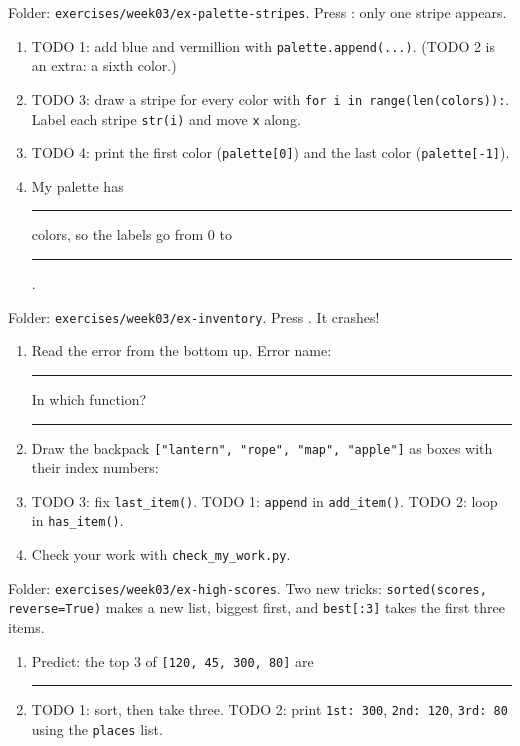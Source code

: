 \begin{exercise}
Folder: \texttt{exercises/week03/ex-palette-stripes}. Press : only one stripe appears.
\begin{enumerate}[leftmargin=1.4em]
  \item TODO 1: add blue and vermillion with \texttt{palette.append(...)}. (TODO 2 is an extra: a sixth color.)
  \item TODO 3: draw a stripe for every color with \texttt{for i in range(len(colors)):}. Label each stripe \texttt{str(i)} and move \texttt{x} along.
  \item TODO 4: print the first color (\texttt{palette[0]}) and the last color (\texttt{palette[-1]}).
  \item My palette has \rule{1cm}{0.4pt} colors, so the labels go from 0 to \rule{1cm}{0.4pt}.
\end{enumerate}
\end{exercise}

\begin{exercise}
Folder: \texttt{exercises/week03/ex-inventory}. Press . It crashes!
\begin{enumerate}[leftmargin=1.4em]
  \item Read the error from the bottom up. Error name: \rule{3.5cm}{0.4pt}\quad In which function? \rule{3.5cm}{0.4pt}
  \item Draw the backpack \texttt{["lantern", "rope", "map", "apple"]} as boxes with their index numbers:
  \answerspace{1.4cm}
  \item TODO 3: fix \texttt{last\_item()}. TODO 1: \texttt{append} in \texttt{add\_item()}. TODO 2: loop in \texttt{has\_item()}.
  \item Check your work with \texttt{check\_my\_work.py}.
\end{enumerate}
\end{exercise}

\begin{exercise}
Folder: \texttt{exercises/week03/ex-high-scores}. Two new tricks:
\texttt{sorted(scores, reverse=True)} makes a new list, biggest first, and \texttt{best[:3]} takes the first three items.
\begin{enumerate}[leftmargin=1.4em]
  \item Predict: the top 3 of \texttt{[120, 45, 300, 80]} are \rule{4cm}{0.4pt}
  \item TODO 1: sort, then take three. TODO 2: print \texttt{1st: 300}, \texttt{2nd: 120}, \texttt{3rd: 80} using the \texttt{places} list.
\end{enumerate}
\end{exercise}

